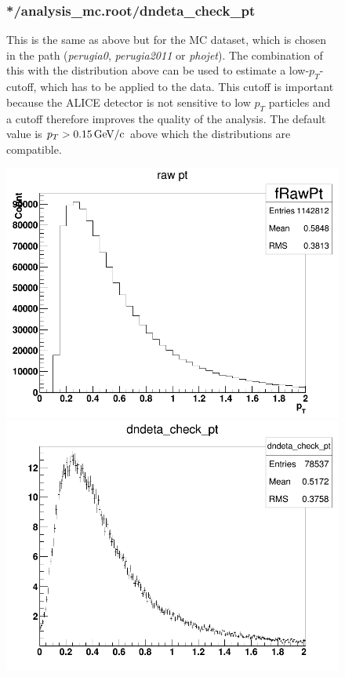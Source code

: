 \documentclass{article}
\begin{document}
\begin{figure}[H]
\begin{minipage}[b]{0.55\textwidth}
\subsubsection*{*/analysis\_mc.root/dndeta\_check\_pt}
This is the same as above but for the MC dataset, which is chosen in the path (\textit{perugia0}, \textit{perugia2011} or \textit{phojet}). The combination of this with the distribution above can be used to estimate a low-$p_{T}$-cutoff, which has to be applied to the data. This cutoff is important because the ALICE detector is not sensitive to low $p_{T}$ particles and a cutoff therefore improves the quality of the analysis. The default value is $p_{T} > \unit[0.15]{GeV/c}$ above which the distributions are compatible.\\
\end{minipage}
\begin{minipage}[b]{0.45\textwidth}
\centering
\includegraphics[width=\textwidth]{images/fRawPt.png}
\includegraphics[width=\textwidth]{images/dndeta_check_pt.png}
\vspace{\baselineskip}
\end{minipage}
\end{figure}
\end{document}
